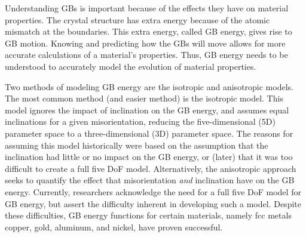 \documentclass[twoside,senior]{BYUPhys}
\begin{document}
Understanding GBs is important because of the effects they have on material properties.\cite{patala2013, homer2015, bulatov2014}  The crystal structure has extra energy because of the atomic mismatch at the boundaries.  This extra energy, called GB energy, gives rise to GB motion.  Knowing and predicting how the GBs will move allows for more accurate calculations of a material's properties.  Thus, GB energy needs to be understood to accurately model the evolution of material properties.

Two methods of modeling GB energy are the isotropic and anisotropic models.  The most common method (and easier method) is the isotropic model.  This model ignores the impact of inclination on the GB energy, and assumes equal inclinations for a given misorientation, reducing the five-dimensional (5D) parameter space to a three-dimensional (3D) parameter space.  The reasons for assuming this model historically were based on the assumption that the inclination had little or no impact on the GB energy, or (later) that it was too difficult to create a full five DoF model.\cite{homer2015}  Alternatively, the anisotropic approach seeks to quantify the effect that misorientation \emph{and} inclination have on the GB energy.  Currently, researchers acknowledge the need for a full five DoF model for GB energy, but assert the difficulty inherent in developing such a model.\cite{rohrer2011, lejcek2010, homer2015}  Despite these difficulties, GB energy functions for certain materials, namely fcc metals copper, gold, aluminum, and nickel, have proven successful.\cite{bulatov2014}
\end{document}
